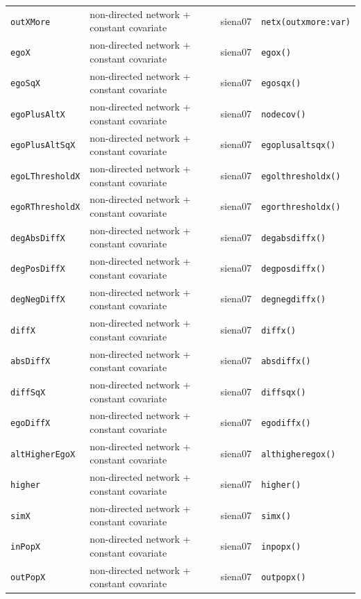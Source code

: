 \begin{longtable}{@{}p{2.6cm}p{3.2cm}p{2.9cm}p{5.4cm}@{}}
\texttt{outXMore} & non-directed network + constant covariate & siena07 & \texttt{netx(outxmore:var)}\\
\texttt{egoX} & non-directed network + constant covariate & siena07 & \texttt{egox()}\\
\texttt{egoSqX} & non-directed network + constant covariate & siena07 & \texttt{egosqx()}\\
\texttt{egoPlusAltX} & non-directed network + constant covariate & siena07 & \texttt{nodecov()}\\
\texttt{egoPlusAltSqX} & non-directed network + constant covariate & siena07 & \texttt{egoplusaltsqx()}\\
\texttt{egoLThresholdX} & non-directed network + constant covariate & siena07 & \texttt{egolthresholdx()}\\
\texttt{egoRThresholdX} & non-directed network + constant covariate & siena07 & \texttt{egorthresholdx()}\\
\texttt{degAbsDiffX} & non-directed network + constant covariate & siena07 & \texttt{degabsdiffx()}\\
\texttt{degPosDiffX} & non-directed network + constant covariate & siena07 & \texttt{degposdiffx()}\\
\texttt{degNegDiffX} & non-directed network + constant covariate & siena07 & \texttt{degnegdiffx()}\\
\texttt{diffX} & non-directed network + constant covariate & siena07 & \texttt{diffx()}\\
\texttt{absDiffX} & non-directed network + constant covariate & siena07 & \texttt{absdiffx()}\\
\texttt{diffSqX} & non-directed network + constant covariate & siena07 & \texttt{diffsqx()}\\
\texttt{egoDiffX} & non-directed network + constant covariate & siena07 & \texttt{egodiffx()}\\
\texttt{altHigherEgoX} & non-directed network + constant covariate & siena07 & \texttt{althigheregox()}\\
\texttt{higher} & non-directed network + constant covariate & siena07 & \texttt{higher()}\\
\texttt{simX} & non-directed network + constant covariate & siena07 & \texttt{simx()}\\
\texttt{inPopX} & non-directed network + constant covariate & siena07 & \texttt{inpopx()}\\
\texttt{outPopX} & non-directed network + constant covariate & siena07 & \texttt{outpopx()}\\

\end{longtable}
